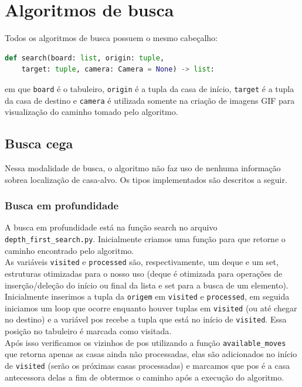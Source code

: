 \documentclass[12pt]{article}
\begin{document}
\section{Algoritmos de busca}
Todos os algoritmos de busca possuem o mesmo cabeçalho:

\begin{lstlisting}[language=Python]
def search(board: list, origin: tuple,
	target: tuple, camera: Camera = None) -> list:
\end{lstlisting}

em que \verb|board| é o tabuleiro, \verb|origin| é a tupla da casa de início, \verb|target| é a tupla da casa de destino e \verb|camera| é utilizada somente na criação de imagens GIF para visualização do caminho tomado pelo algoritmo.

\subsection{Busca cega}
Nessa modalidade de busca, o algoritmo não faz uso de nenhuma informação sobrea localização de casa-alvo. Os tipos implementados são descritos a seguir.

\subsubsection{Busca em profundidade}
A busca em profundidade está na função search no arquivo \verb|depth_first_search.py|. Inicialmente criamos uma função para que retorne o caminho encontrado pelo algoritmo.\\

As variáveis \verb|visited| e \verb|processed| são, respectivamente, um deque e um set, estruturas otimizadas para o nosso uso (deque é otimizada para operações de inserção/deleção do início ou final da lista e set para a busca de um elemento). Inicialmente inserimos a tupla da \verb|origem| em \verb|visited| e \verb|processed|, em seguida iniciamos um loop que ocorre enquanto houver tuplas em \verb|visited| (ou até chegar no destino) e a variável pos recebe a tupla que está no início de \verb|visited|. Essa posição no tabuleiro é marcada como visitada.\\

Após isso verificamos os vizinhos de pos utilizando a função \verb|available_moves| que retorna apenas as casas ainda não processadas, elas são adicionados no início de \verb|visited| (serão os próximas casas processadas) e marcamos que pos é a casa antecessora delas a fim de obtermos o caminho após a execução do algoritmo.\\
\end{document}
